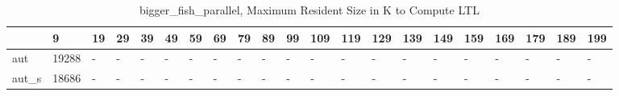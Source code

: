 \begin{table}
\caption{bigger_fish_parallel, Maximum Resident Size in K to Compute LTL}
\label{bigger_fish_parallel_LTL_size}
\begin{tabular}{lllllllllllllllllllll}
\toprule
 & 9 & 19 & 29 & 39 & 49 & 59 & 69 & 79 & 89 & 99 & 109 & 119 & 129 & 139 & 149 & 159 & 169 & 179 & 189 & 199 \\
\midrule
aut & 19288 & - & - & - & - & - & - & - & - & - & - & - & - & - & - & - & - & - & - & - \\
aut_s & 18686 & - & - & - & - & - & - & - & - & - & - & - & - & - & - & - & - & - & - & - \\
\bottomrule
\end{tabular}
\end{table}
